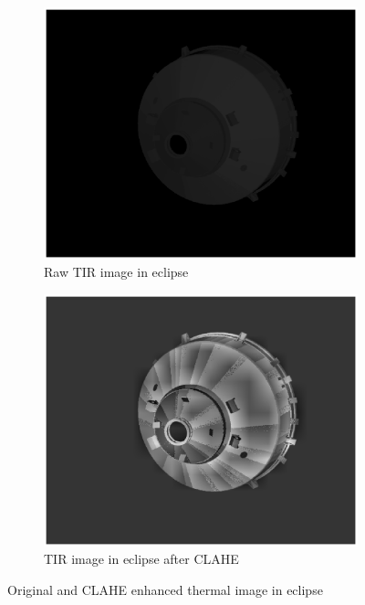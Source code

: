 \begin{figure}[!h]
    \begin{subfigure}{0.48\linewidth}
    \centering
    \includegraphics[width = 1\linewidth]{Images/eclipse_preclahe.eps}
    \caption{Raw TIR image in eclipse}
    \label{fig:preclahe}
    \end{subfigure}\hfill
    \begin{subfigure}{0.48\linewidth}
    \centering
    \includegraphics[width = 1\linewidth]{Images/eclipse_postclahe.eps}
    \caption{TIR image in eclipse after CLAHE}
    \label{fig:postclahe}
    \end{subfigure}
    \caption{Original and CLAHE enhanced thermal image in eclipse}
    \label{fig:prepostclahe}
\end{figure}

